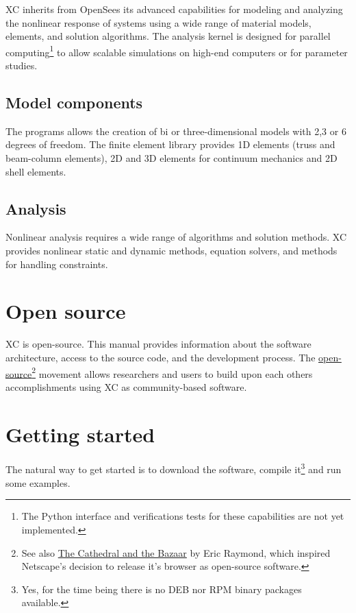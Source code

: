 XC inherits from OpenSees its advanced capabilities for modeling and analyzing the nonlinear response of systems using a wide range of material models, elements, and solution algorithms. The analysis kernel is designed for parallel computing\footnote{The Python interface and verifications tests for these capabilities are not yet implemented.} to allow scalable simulations on high-end computers or for parameter studies.

\subsection{Model components}

The programs allows the creation of bi or three-dimensional models with 2,3 or 6 degrees of freedom. The finite element library provides 1D elements (truss and beam-column elements), 2D and 3D elements for continuum mechanics and 2D shell elements.

\subsection{Analysis}
Nonlinear analysis requires a wide range of algorithms and solution methods. XC provides nonlinear static and dynamic methods, equation solvers, and methods for handling constraints.

\section{Open source}
XC is open-source. This manual provides information about the software architecture, access to the source code, and the development process. The \href{https://opensource.org/}{open-source}\footnote{See also \href{http://www.unterstein.net/su/docs/CathBaz.pdf}{The Cathedral and the Bazaar} by Eric Raymond, which inspired Netscape's decision to release it's browser as open-source software.} movement allows researchers and users to build upon each others accomplishments using XC as community-based software.

\section{Getting started}

The natural way to get started is to download the software, compile it\footnote{Yes, for the time being there is no DEB nor RPM binary packages available.} and run some examples.


